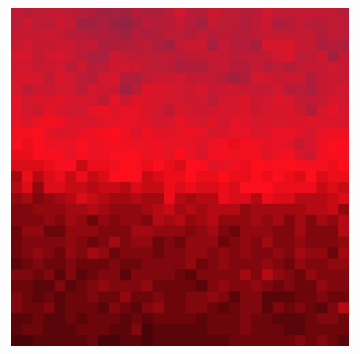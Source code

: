 \documentclass[10pt]{scrartcl}
\begin{document}
\begin{figure}[!ht]
\begin{subfigure}[b]{.3\linewidth}
    \end{subfigure}
    \begin{subfigure}[b]{.3\linewidth}
        \centering
        \includegraphics[width=1.2\linewidth]{../plots_tables_images/1d1dcrop_3_0.eps}
    \end{subfigure}



\end{figure}
\end{document}
